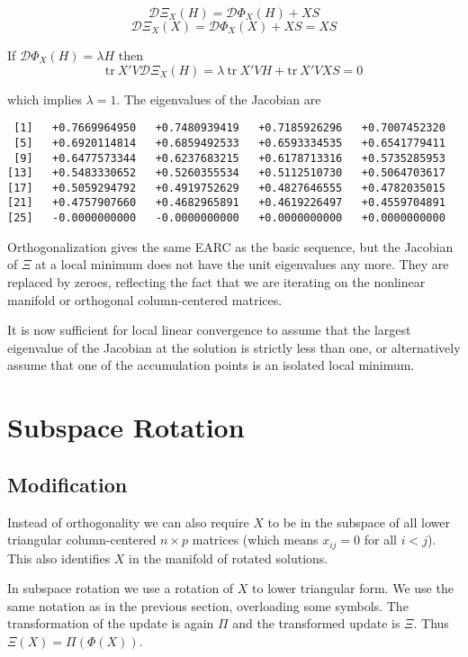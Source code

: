 \documentclass[
  12pt,
  letterpaper,
  DIV=11,
  numbers=noendperiod]{scrartcl}
\begin{document}
\[
\mathcal{D}\Xi_X(H)=\mathcal{D}\Phi_X(H)+XS
\] \[
\mathcal{D}\Xi_X(X)=\mathcal{D}\Phi_X(X)+XS=XS
\]

If \(\mathcal{D}\Phi_X(H)=\lambda H\) then \[
\text{tr}\ X'V\mathcal{D}\Xi_X(H)=\lambda\ \text{tr}\ X'VH+\text{tr}\ X'VXS=0
\]

which implies \(\lambda = 1\). The eigenvalues of the Jacobian are

\begin{verbatim}
 [1]   +0.7669964950   +0.7480939419   +0.7185926296   +0.7007452320
 [5]   +0.6920114814   +0.6859492533   +0.6593334535   +0.6541779411
 [9]   +0.6477573344   +0.6237683215   +0.6178713316   +0.5735285953
[13]   +0.5483330652   +0.5260355534   +0.5112510730   +0.5064703617
[17]   +0.5059294792   +0.4919752629   +0.4827646555   +0.4782035015
[21]   +0.4757907660   +0.4682965891   +0.4619226497   +0.4559704891
[25]   -0.0000000000   -0.0000000000   +0.0000000000   +0.0000000000
\end{verbatim}

Orthogonalization gives the same EARC as the basic sequence, but the
Jacobian of \(\Xi\) at a local minimum does not have the unit
eigenvalues any more. They are replaced by zeroes, reflecting the fact
that we are iterating on the nonlinear manifold or orthogonal
column-centered matrices.

It is now sufficient for local linear convergence to assume that the
largest eigenvalue of the Jacobian at the solution is strictly less than
one, or alternatively assume that one of the accumulation points is an
isolated local minimum.

\section{Subspace Rotation}\label{subspace-rotation}

\subsection{Modification}\label{modification-1}

Instead of orthogonality we can also require \(X\) to be in the subspace
of all lower triangular column-centered \(n\times p\) matrices (which
means \(x_{ij}=0\) for all \(i<j\)). This also identifies \(X\) in the
manifold of rotated solutions.

In subspace rotation we use a rotation of \(X\) to lower triangular
form. We use the same notation as in the previous section, overloading
some symbols. The transformation of the update is again \(\Pi\) and the
transformed update is \(\Xi\). Thus \(\Xi(X)=\Pi(\Phi(X))\).
\end{document}
